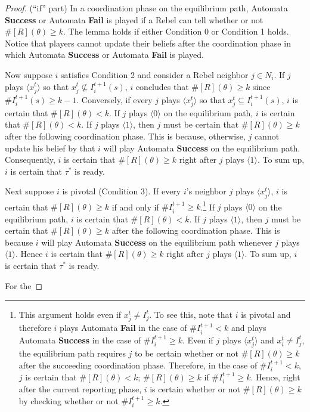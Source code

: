 \documentclass[12pt,letter]{article}
\theoremstyle{definition}
\theoremstyle{definition}
\theoremstyle{remark}
\theoremstyle{claim}
\begin{document}
\begin{proof}(``if'' part)
In a coordination phase on the equilibrium path, Automata \textbf{Success} or Automata \textbf{Fail} is played if a Rebel can tell whether or not $\#[R](\theta)\geq k$. The lemma holds if either Condition 0 or Condition 1 holds. Notice that players cannot update their beliefs after the coordination phase in which Automata \textbf{Success} or Automata \textbf{Fail} is played.

Now suppose $i$ satisfies Condition 2 and consider a Rebel neighbor $j\in N_i$. If $j$ plays $\langle x^t_j \rangle$ so that $x^t_j\not\subseteq I^{t+1}_i(s)$, $i$ concludes that $\#[R](\theta)\geq k$ since $\#I^{t+1}_i(s)\geq k-1$. Conversely, if every  $j$ plays $\langle x^t_j \rangle$ so that $x^t_j\subseteq I^{t+1}_i(s)$, $i$ is certain that $\#[R](\theta)<k$. If $j$ plays $\langle 0 \rangle$ on the equilibrium path, $i$ is certain that $\#[R](\theta)<k$. If $j$ plays $\langle 1 \rangle$, then $j$ must be certain that $\#[R](\theta)\geq k$ after the following coordination phase. This is because, otherwise, $j$ cannot update his belief by that $i$ will play Automata \textbf{Success} on the equilibrium path. Consequently, $i$ is certain that $\#[R](\theta)\geq k$ right after $j$ plays $\langle 1 \rangle$. To sum up, $i$ is certain that $\tau^{*}$ is ready.

Next suppose $i$ is pivotal (Condition 3). If every $i$'s neighbor $j$ plays $\langle x^t_j \rangle$, $i$ is certain that $\#[R](\theta)\geq k$ if and only if $\#I^{t+1}_i\geq k$.\footnote{This argument holds even if $x^t_j\neq I^t_j$. To see this, note that $i$ is pivotal and therefore $i$ plays Automata \textbf{Fail} in the case of $\#I^{t+1}_i<k$ and plays Automata \textbf{Success} in the case of $\#I^{t+1}_i\geq k$. Even if $j$ plays $\langle x^t_j \rangle$ and $x^t_i\neq I^t_j$, the equilibrium path requires $j$ to be certain whether or not $\#[R](\theta)\geq k$ after the succeeding coordination phase. Therefore, in the case of $\#I^{t+1}_i<k$, $j$ is certain that $\#[R](\theta)<k$; $\#[R](\theta)\geq k$ if $\#I^{t+1}_i\geq k$. Hence, right after the current reporting phase, $i$ is certain whether or not $\#[R](\theta)\geq k$ by checking whether or not $\#I^{t+1}_i\geq k$.} If $j$ plays $\langle 0 \rangle$ on the equilibrium path, $i$ is certain that $\#[R](\theta)<k$. If $j$ plays $\langle 1 \rangle$, then $j$ must be certain that $\#[R](\theta)\geq k$ after the following coordination phase. This is because $i$ will play Automata \textbf{Success} on the equilibrium path whenever $j$ plays $\langle 1 \rangle$. Hence $i$ is certain that $\#[R](\theta)\geq k$ right after $j$ plays $\langle 1 \rangle$. To sum up, $i$ is certain that $\tau^{*}$ is ready.

For the

\end{proof}
\end{document}
